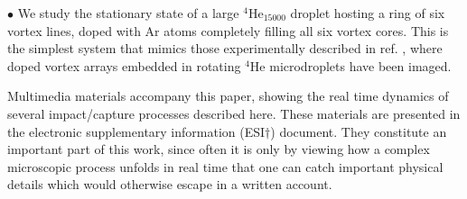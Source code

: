 $\bullet$ We study the stationary state of 
a large $^4$He$_{15000}$ 
droplet hosting a ring of six vortex lines, doped with 
Ar atoms completely filling all six vortex cores. This is the simplest system that mimics those
experimentally described in ref. \citep{Gom14}, where 
doped vortex arrays embedded in rotating $^4$He microdroplets have been imaged.
 


Multimedia materials accompany this paper, 
showing the real time dynamics of several impact/capture processes 
described here. These materials  are presented 
in the electronic supplementary information (ESI$\dag$) document.
They constitute  an important part of this work, 
since often it is only by viewing how a complex microscopic process
unfolds in real time that one can catch important physical details 
which would otherwise escape in a written account. 

